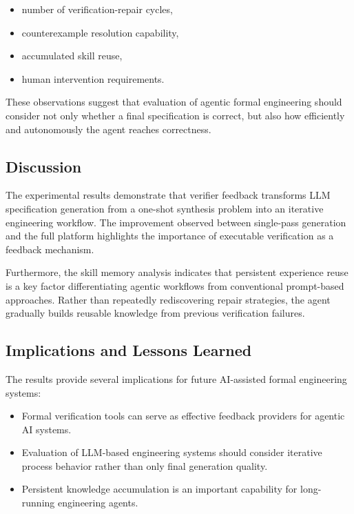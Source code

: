 \begin{itemize}
    \item number of verification-repair cycles,
    \item counterexample resolution capability,
    \item accumulated skill reuse,
    \item human intervention requirements.
\end{itemize}


These observations suggest that evaluation of agentic formal engineering
should consider not only whether a final specification is correct, but also
how efficiently and autonomously the agent reaches correctness.



\subsection{Discussion}

The experimental results demonstrate that verifier feedback transforms LLM
specification generation from a one-shot synthesis problem into an iterative
engineering workflow. The improvement observed between single-pass generation
and the full platform highlights the importance of executable verification as
a feedback mechanism.

Furthermore, the skill memory analysis indicates that persistent experience
reuse is a key factor differentiating agentic workflows from conventional
prompt-based approaches. Rather than repeatedly rediscovering repair strategies,
the agent gradually builds reusable knowledge from previous verification
failures.


\subsection{Implications and Lessons Learned}

The results provide several implications for future AI-assisted formal
engineering systems:

\begin{itemize}

\item Formal verification tools can serve as effective feedback providers for
agentic AI systems.

\item Evaluation of LLM-based engineering systems should consider iterative
process behavior rather than only final generation quality.

\item Persistent knowledge accumulation is an important capability for
long-running engineering agents.

\end{itemize}


